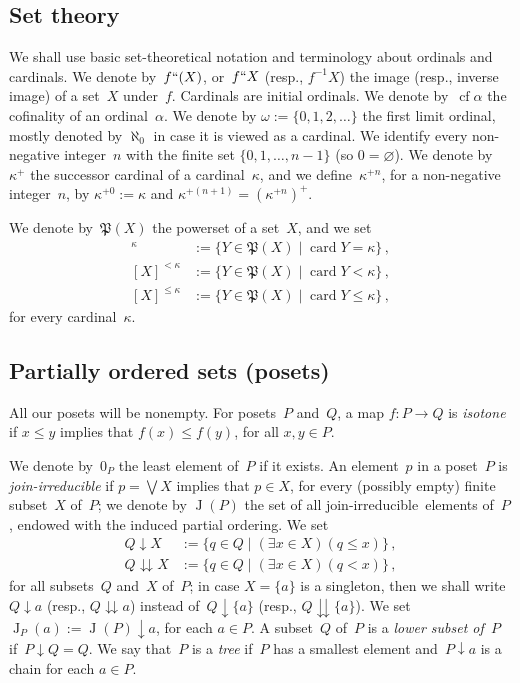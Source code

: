 \documentclass[psamsfonts,reqno]{amsart}
\theoremstyle{plain}
\theoremstyle{definition}
\theoremstyle{remark}
\numberwithin{equation}{section}
\numberwithin{figure}{section}
\newcommand{\ga}{\alpha}
\newcommand{\gk}{\kappa}
\newcommand{\go}{\omega}
\newcommand{\les}{\leqslant}
\DeclareMathOperator{\card}{card}
\DeclareMathOperator{\cf}{cf}
\DeclareMathOperator{\J}{J}
\newcommand{\Pow}{\mathfrak{P}}
\newcommand{\jirr}{join-ir\-re\-duc\-i\-ble}
\newcommand{\es}{\varnothing}
\newcommand{\set}[1]{\{#1\}}
\newcommand{\setm}[2]{\set{#1\mid#2}}
\newcommand{\dnw}{\mathbin{\downarrow}}
\newcommand{\ddnw}{\mathbin{\downdownarrows}}
\begin{document}
\subsection{Set theory}\label{Su:BasicSet}
We shall use basic set-theoretical notation and terminology about ordinals and cardinals. 
We denote by~$f``(X)$, or~$f``X$ (resp., $f^{-1}X$) the image (resp., inverse image) of a set~$X$ under~$f$. Cardinals are initial ordinals. We denote by~$\cf\ga$ the cofinality of an ordinal~$\ga$. We denote by $\go:=\set{0,1,2,\dots}$ the first limit ordinal, mostly denoted by $\aleph_0$ in case it is viewed as a cardinal. We identify every non-negative integer~$n$ with the finite set $\set{0,1,\dots,n-1}$ (so $0=\es$). We denote by~$\gk^+$ the successor cardinal of a cardinal~$\gk$, and we define~$\gk^{+n}$, for a non-negative integer~$n$, by $\gk^{+0}:=\gk$ and $\gk^{+(n+1)}=(\gk^{+n})^+$.

We denote by~$\Pow(X)$ the powerset of a set~$X$, and we set
 \begin{align*}
 [X]^\gk&:=\setm{Y\in\Pow(X)}{\card Y=\gk}\,,\\
 [X]^{<\gk}&:=\setm{Y\in\Pow(X)}{\card Y<\gk}\,,\\
 [X]^{{\les}\gk}&:=\setm{Y\in\Pow(X)}{\card Y\leq\gk}\,,
 \end{align*}
for every cardinal~$\gk$.

\subsection{Partially ordered sets (posets)}\label{Su:Posets}
All our posets will be nonempty. For posets~$P$ and~$Q$, a map $f\colon P\to Q$ is \emph{isotone} if $x\leq y$ implies that $f(x)\leq f(y)$, for all $x,y\in P$.

We denote by~$0_P$ the least element of~$P$ if it exists. An element~$p$ in a poset~$P$ is \emph{\jirr} if $p=\bigvee X$ implies that $p\in X$, for every (possibly empty) finite subset~$X$ of~$P$; we denote by $\J(P)$ the set of all \jirr\ elements of~$P$, endowed with the induced partial ordering. We set
 \begin{align*}
 Q\dnw X&:=\setm{q\in Q}{(\exists x\in X)(q\leq x)}\,,\\
 Q\ddnw X&:=\setm{q\in Q}{(\exists x\in X)(q<x)}\,,
  \end{align*}
for all subsets~$Q$ and~$X$ of~$P$; in case $X=\set{a}$ is a singleton, then we shall write $Q\dnw a$ (resp., $Q\ddnw a$) instead of~$Q\dnw\set{a}$ (resp., $Q\ddnw\set{a}$). We set $\J_P(a):=\J(P)\dnw a$, for each $a\in P$. A subset~$Q$ of~$P$ is a \emph{lower subset of~$P$} if~$P\dnw Q=Q$. We say that~$P$ is a \emph{tree} if~$P$ has a smallest element and~$P\dnw a$ is a chain for each $a\in P$.
\end{document}
